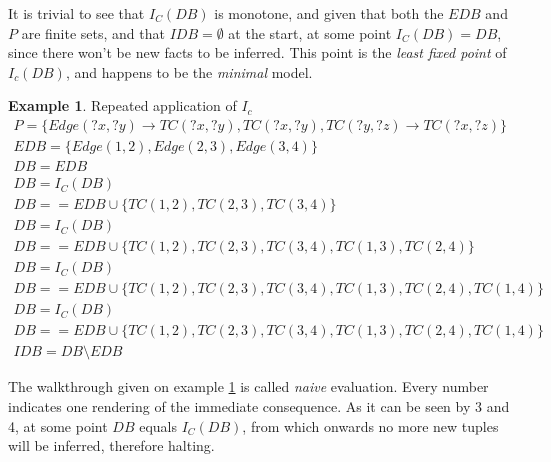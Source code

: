 \documentclass[manuscript,screen,review]{acmart}
\theoremstyle{definition}
\newtheorem{exmp}{Example}[section]
\begin{document}
It is trivial to see that $I_C(DB)$ is monotone, and given that both the $EDB$ and $P$ are finite sets, and that $IDB = \emptyset$ at the start,
at some point $I_C(DB) = DB$, since there won't be new facts to be inferred. This point is the \textit{least fixed point} of $I_c(DB)$\cite{datalog},
and happens to be the \textit{minimal} model.
\begin{exmp}{Repeated application of $I_c$}
	\begin{align}
		P = \{ Edge(?x, ?y) \rightarrow TC(?x, ?y), TC(?x, ?y), TC(?y, ?z) \rightarrow TC(?x, ?z) \} \nonumber           \\
		EDB = \{ Edge(1, 2), Edge(2, 3), Edge(3, 4) \}                                               \nonumber           \\
		DB = EDB                                                                                     \nonumber           \\
		DB = I_C(DB)                                                                                                     \\
		DB == EDB \cup \{ TC(1, 2), TC(2, 3), TC(3, 4) \}                                                      \nonumber \\
		DB = I_C(DB)                                                                                           \nonumber \\
		DB == EDB \cup \{ TC(1, 2), TC(2, 3), TC(3, 4), TC(1, 3), TC(2, 4) \}                                  \nonumber \\
		DB = I_C(DB)                                                                                                     \\
		DB == EDB \cup \{ TC(1, 2), TC(2, 3), TC(3, 4), TC(1, 3), TC(2, 4), TC(1, 4) \}                        \nonumber \\
		DB = I_C(DB)                                                                                                     \\
		DB == EDB \cup \{ TC(1, 2), TC(2, 3), TC(3, 4), TC(1, 3), TC(2, 4), TC(1, 4) \}                        \nonumber \\
		IDB = DB \setminus EDB
	\end{align}
	\label{ex5}
\end{exmp}

The walkthrough given on example \ref{ex5} is called \textit{naive} evaluation. Every number indicates one rendering of the immediate consequence. As it can be seen by 3 and 4, at some point $DB$ equals $I_C(DB)$, from which onwards no more new tuples will be inferred, therefore halting.
\end{document}
